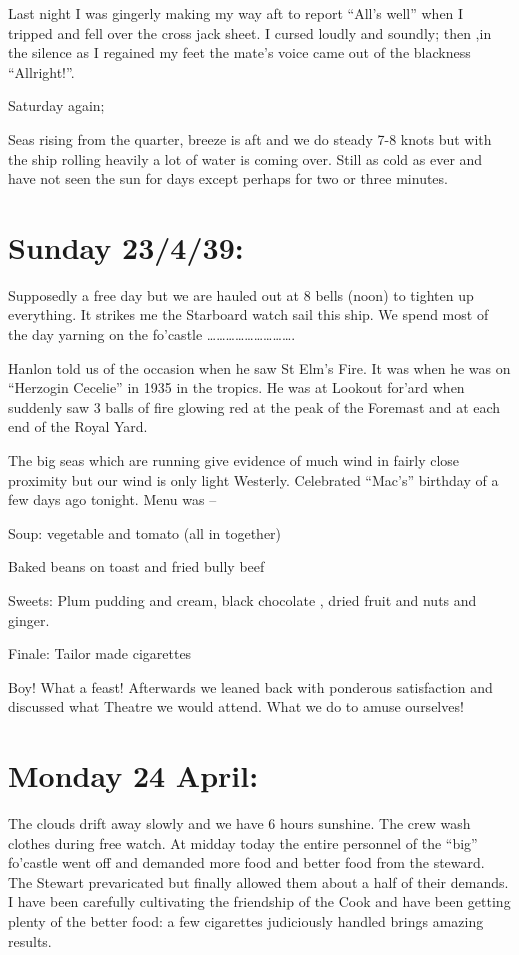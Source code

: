 \documentclass[
  11pt,
  msmallroyalvopaper
]{memoir}
\begin{document}
Last night I was gingerly making my way aft to report ``All's well''
when I tripped and fell over the cross jack sheet. I cursed loudly and
soundly; then ,in the silence as I regained my feet the mate's voice
came out of the blackness ``Allright!''.

Saturday again;

Seas rising from the quarter, breeze is aft and we do steady 7-8 knots
but with the ship rolling heavily a lot of water is coming over. Still
as cold as ever and have not seen the sun for days except perhaps for
two or three minutes.

\hypertarget{sunday-23439}{%
\section{Sunday 23/4/39:}\label{sunday-23439}}

Supposedly a free day but we are hauled out at 8 bells (noon) to tighten
up everything. It strikes me the Starboard watch sail this ship. We
spend most of the day yarning on the fo'castle
\ldots\ldots\ldots\ldots\ldots\ldots\ldots\ldots\ldots.

Hanlon told us of the occasion when he saw St Elm's Fire. It was when he
was on ``Herzogin Cecelie'' in 1935 in the tropics. He was at Lookout
for'ard when suddenly saw 3 balls of fire glowing red at the peak of the
Foremast and at each end of the Royal Yard.

The big seas which are running give evidence of much wind in fairly
close proximity but our wind is only light Westerly. Celebrated
``Mac's'' birthday of a few days ago tonight. Menu was --

Soup: vegetable and tomato (all in together)

Baked beans on toast and fried bully beef

Sweets: Plum pudding and cream, black chocolate , dried fruit and nuts
and ginger.

Finale: Tailor made cigarettes

Boy! What a feast! Afterwards we leaned back with ponderous satisfaction
and discussed what Theatre we would attend. What we do to amuse
ourselves!

\hypertarget{monday-24-april}{%
\section{Monday 24 April:}\label{monday-24-april}}

The clouds drift away slowly and we have 6 hours sunshine. The crew wash
clothes during free watch. At midday today the entire personnel of the
``big'' fo'castle went off and demanded more food and better food from
the steward. The Stewart prevaricated but finally allowed them about a
half of their demands. I have been carefully cultivating the friendship
of the Cook and have been getting plenty of the better food: a few
cigarettes judiciously handled brings amazing results.
\end{document}
